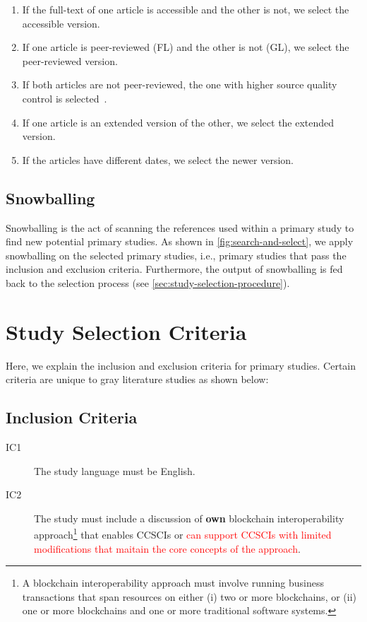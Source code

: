 \documentclass[review]{elsarticle}
\begin{document}
\begin{enumerate}
	\item If the full-text of one article is accessible and the other is not, we select the accessible version.
	\item If one article is peer-reviewed (FL) and the other is not (GL), we select the peer-reviewed version.
	\item If both articles are not peer-reviewed, the one with higher source quality control is selected~\cite{Garousi2017MLR}.
	\item If one article is an extended version of the other, we select the extended version.
	\item If the articles have different dates, we select the newer version.
\end{enumerate}

\subsection{Snowballing}
Snowballing is the act of scanning the references used within a primary study to find new potential primary studies.
As shown in \cref{fig:search-and-select}, we apply snowballing on the selected primary studies, i.e., primary studies that pass the inclusion and exclusion criteria.
Furthermore, the output of snowballing is fed back to the selection process (see \cref{sec:study-selection-procedure}).

\section{Study Selection Criteria}
\label{sec:study-selection-criteria}
Here, we explain the inclusion and exclusion criteria for primary studies.
Certain criteria are unique to gray literature studies as shown below:

\subsection{Inclusion Criteria}
\begin{description}
	\item[IC1] The study language must be English.
	\item[IC2] The study must include a discussion of \textbf{own} blockchain interoperability approach\footnote{A blockchain interoperability approach must involve running business transactions that span resources on either (i) two or more blockchains, or (ii) one or more blockchains and one or more traditional software systems.} that enables CCSCIs or \textcolor{red}{can support CCSCIs with limited modifications that maitain the core concepts of the approach}.
\end{description}
\end{document}
